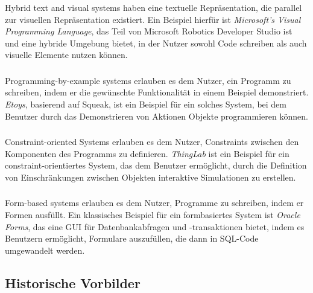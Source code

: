 \documentclass[ngerman]{article}
\begin{document}
\subsubsection{}
Hybrid text and visual systems haben eine textuelle Repräsentation, die parallel zur visuellen Repräsentation existiert. Ein Beispiel hierfür ist \textit{Microsoft's Visual Programming Language}, das Teil von Microsoft Robotics Developer Studio ist und eine hybride Umgebung bietet, in der Nutzer sowohl Code schreiben als auch visuelle Elemente nutzen können.

\subsubsection{}
Programming-by-example systems erlauben es dem Nutzer, ein Programm zu schreiben, indem er die gewünschte Funktionalität in einem Beispiel demonstriert. \textit{Etoys}, basierend auf Squeak, ist ein Beispiel für ein solches System, bei dem Benutzer durch das Demonstrieren von Aktionen Objekte programmieren können.

\subsubsection{}
Constraint-oriented Systems erlauben es dem Nutzer, Constraints zwischen den Komponenten des Programms zu definieren. \textit{ThingLab} ist ein Beispiel für ein constraint-orientiertes System, das dem Benutzer ermöglicht, durch die Definition von Einschränkungen zwischen Objekten interaktive Simulationen zu erstellen.

\subsubsection{}
Form-based systems erlauben es dem Nutzer, Programme zu schreiben, indem er Formen ausfüllt. Ein klassisches Beispiel für ein formbasiertes System ist \textit{Oracle Forms}, das eine GUI für Datenbankabfragen und -transaktionen bietet, indem es Benutzern ermöglicht, Formulare auszufüllen, die dann in SQL-Code umgewandelt werden.

\subsection{Historische Vorbilder}
\end{document}
